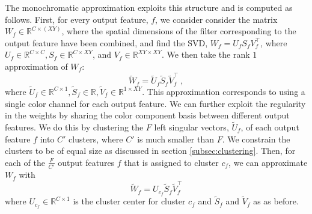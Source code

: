 The monochromatic approximation exploits this structure and is computed as follows.
First, for every output feature, $f$, we consider consider the matrix $W_f \in \mathbb{R}^{C \times (XY) }$, 
where the spatial dimensions of the filter corresponding to the output feature have been combined, and find the SVD, 
$W_f = U_f S_f V_f^{\top}$,
where $U_f \in \mathbb{R}^{C \times C}, S_f \in \mathbb{R}^{C \times XY}$, and $V_f \in \mathbb{R}^{XY \times XY}$. 
We then take the rank $1$ approximation of $W_f$: 
\begin{equation}
\label{blo1}
	\tilde{W}_f = \tilde{U}_f \tilde{S}_f \tilde{V}_f^{\top} ~,
\end{equation}
where $\tilde{U}_f \in \mathbb{R}^{C \times 1}, \tilde{S}_f \in \mathbb{R}, \tilde{V}_f \in \mathbb{R}^{1 \times XY}$.
This approximation corresponds to using a single color channel for each output feature. 
We can further exploit the regularity in the weights by sharing the color component basis between different output features. 
We do this by clustering the $F$ left singular vectors, $\tilde{U}_f$, of each output feature $f$ into $C'$ clusters, 
where $C'$ is much smaller than $F$. We constrain the clusters to be of equal size as discussed in section \ref{subsec:clustering}.  
Then, for each of the $\frac{F}{C'}$ output features $f$ that is assigned to cluster $c_f$, we can approximate $W_f$ with
\begin{equation}
\label{blo2}
	\tilde{W}_f = U_{c_f} \tilde{S}_f \tilde{V}_f^{\top}
\end{equation}
where $U_{c_f} \in \mathbb{R}^{C \times 1}$ is the cluster center for cluster $c_f$ and $\tilde{S}_f$ and $\tilde{V}_f$ as as before. 


